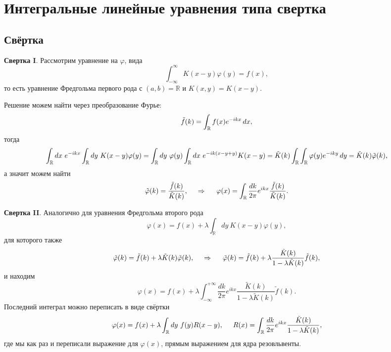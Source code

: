 \section{Интегральные линейные уравнения типа свертка}

\subsection*{Свёртка}


\textbf{Свертка I}. Рассмотрим уравнение на $\varphi$, вида
\begin{equation*}
	\int_{-\infty}^{\infty} K(x-y) \varphi(y) = f(x),
\end{equation*}
то есть уравнение Фредгольма первого рода с $(a, b) = \mathbb{R}$
 и $K(x,y) = K(x-y)$. 

Решение можем найти через преобразование Фурье:
\begin{equation*}
	\tilde{f}(k) = \int_{\mathbb{R}} f(x) e^{-ikx} \, d x,
\end{equation*}
тогда
\begin{equation*}
	\int_{\mathbb{R}} dx\ e^{-ikx} \int_{\mathbb{R}} dy\ K(x-y) \varphi(y) = \int_{\mathbb{R}} dy\ \varphi(y) \int_{\mathbb{R}} dx\ e^{-ik(x-y+y)} K(x-y) = \tilde{K} (k) \int_{\mathbb{R}} \int_{\mathbb{R}} \varphi(y) e^{-iky} \d y = \tilde{K}(k) \tilde{\varphi}(k),
\end{equation*}
а значит можем найти
\begin{equation}
	\tilde{\varphi}(k) = \frac{\tilde{f}(k)}{\tilde{K}(k)},
	\hspace{0.5cm} \Rightarrow \hspace{0.5cm}
	 \varphi(x) = \int_{\mathbb{R}} \frac{dk}{2\pi} e^{ikx} \frac{\tilde{f}(k)}{\tilde{K}(k)}.
\end{equation}

\textbf{Свертка II}. Аналогично для уравнения Фредгольма второго рода
\begin{equation*}
	\varphi(x) = f(x) + \lambda \int_{\mathbb{R}} dy\ K(x-y) \varphi(y),
\end{equation*}
для которого также
\begin{equation*}
	\tilde{\varphi}(k) = \tilde{f}(k) + \lambda \tilde{K} (k) \tilde{\varphi}(k),
	\hspace{0.5cm} \Rightarrow \hspace{0.5cm}
	\tilde{\varphi}(k) = \tilde{f}(k) + \lambda \frac{\tilde{K}(k)}{1 - \lambda \tilde{K}(k)} \tilde{f}(k), 
\end{equation*}
и находим
\begin{equation*}
	\varphi(x) = f(x) + \lambda \int_{-\infty}^{+\infty} \frac{dk}{2\pi} e^{ikx} \frac{\tilde{K}(k)}{1 - \lambda \tilde{K}(k)} \tilde{f}(k).
\end{equation*}
Последний интеграл можно переписать в виде свёртки
\begin{equation}
	\varphi(x) = f(x) + \lambda \int_{\mathbb{R}} dy\ f(y) R(x-y),
	\hspace{5 mm} 
	R(x) = \int_{\mathbb{R}} \frac{dk}{2\pi} e^{ik x} \frac{\tilde{K}(k)}{1-\lambda \tilde{K}(k)},
\end{equation}
где мы как раз и переписали выражение для $\varphi(x)$, прямым выражением для ядра резовльвенты. 



